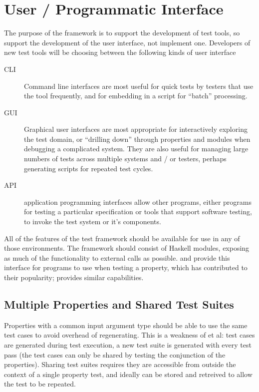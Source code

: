 \section {User / Programmatic Interface}

The purpose of the framework is to support the development of test tools,
so support the development of the user interface, not implement one.
Developers of new test tools will be choosing between the following kinds of user interface

\begin{description}
\item [CLI] Command line interfaces are most useful for 
quick tests by testers that use the tool frequently,
and for embedding in a script for ``batch'' processing.
\item [GUI] Graphical user interfaces are most appropriate for interactively exploring the test domain,
or ``drilling down'' through properties and modules when debugging a complicated system.
They are also useful for managing 
large numbers of tests across multiple systems and / or testers,
perhaps generating scripts for repeated test cycles.
\item [API] application programming interfaces allow other programs,
either programs for testing a particular specification or tools that support software testing,
to invoke the test system or it's components.
\end{description}

All of the features of the test framework should be available for use in any of those environments.
The framework should consist of Haskell modules,
exposing as much of the functionality to external calls as possible.
\QC and \SC provide this interface for programs to use when testing a property,
which has contributed to their popularity;
\FEAT provides similar capabilities.

\subsection{Multiple Properties and Shared Test Suites}

Properties with a common input argument type
should be able to use the same test cases to avoid overhead of regenerating.
This is a weakness of \QC et al:
test cases are generated during test execution,
a new test suite is generated with every test pass
(the test cases can only be shared by testing the conjunction of the properties).
Sharing test suites requires they are accessible from outside the context of a single property test,
and ideally can be stored and retreived to allow the test to be repeated.


